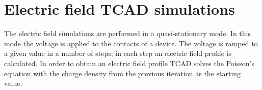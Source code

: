 \documentclass[a4paper,11pt]{article}
\begin{document}
\section{Electric field TCAD simulations}
\label{sec:ef}
The electric field simulations are performed in a quasi-stationary mode.
In this mode the voltage is applied to the contacts of a device.
The voltage is ramped to a given value in a number of steps; in each step an electric field profile is calculated. 
In order to obtain an electric field profile TCAD solves the Poisson's equation with the charge density from the previous iteration as the starting value.
\begin{figure}[t!]
\begin{center}
\begin{minipage}[h]{0.17\linewidth}
\end{minipage}
\hfill 
\begin{minipage}[h]{0.17\linewidth}
\end{minipage}
\hfill 
\begin{minipage}[h]{0.17\linewidth}

\end{minipage}
\end{center}
\end{figure}
\end{document}
